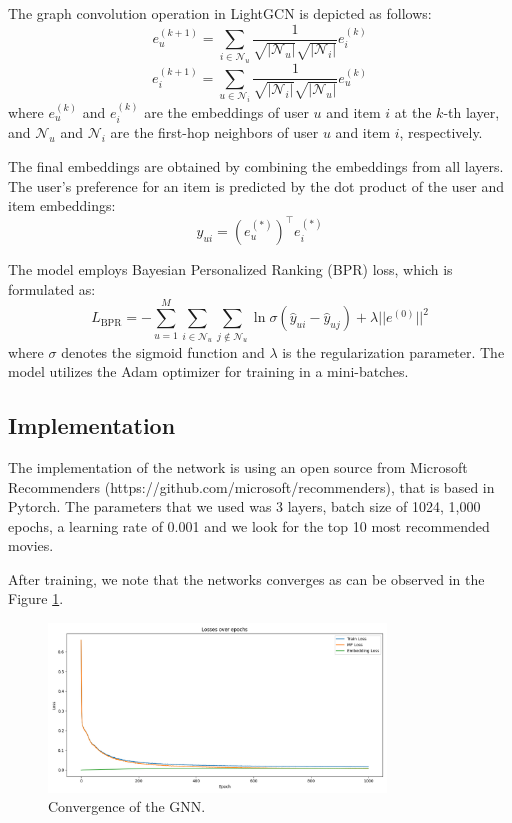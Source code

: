 \documentclass[12pt]{article}
\numberwithin{equation}{section}
\begin{document}
The graph convolution operation in LightGCN is depicted as follows:
\begin{equation}
	e_u^{(k+1)} = \sum_{i \in \mathcal{N}_u} \frac{1}{\sqrt{|\mathcal{N}_u|}\sqrt{|\mathcal{N}_i|}} e_i^{(k)}
\end{equation}
\begin{equation}
	e_i^{(k+1)} = \sum_{u \in \mathcal{N}_i} \frac{1}{\sqrt{|\mathcal{N}_i|}\sqrt{|\mathcal{N}_u|}} e_u^{(k)}
\end{equation}
where $e_u^{(k)}$ and $e_i^{(k)}$ are the embeddings of user $u$ and item $i$ at the $k$-th layer, and $\mathcal{N}_u$ and $\mathcal{N}_i$ are the first-hop neighbors of user $u$ and item $i$, respectively.


The final embeddings are obtained by combining the embeddings from all layers. The user's preference for an item is predicted by the dot product of the user and item embeddings:
\begin{equation}
	\hat{y}_{ui} = (e_u^{(*)})^\top e_i^{(*)}
\end{equation}


The model employs Bayesian Personalized Ranking (BPR) loss, which is formulated as:
\begin{equation}
	L_{\text{BPR}} = -\sum_{u=1}^{M} \sum_{i \in \mathcal{N}_u} \sum_{j \notin \mathcal{N}_u} \ln \sigma(\hat{y}_{ui} - \hat{y}_{uj}) + \lambda ||e^{(0)}||^2
\end{equation}
where $\sigma$ denotes the sigmoid function and $\lambda$ is the regularization parameter. The model utilizes the Adam optimizer for training in a mini-batches.


\subsection{Implementation}

The implementation of the network is using an open source from Microsoft Recommenders (https://github.com/microsoft/recommenders), that is based in Pytorch. The parameters that we used was 3 layers, batch size of 1024, 1,000 epochs, a learning rate of 0.001 and we look for the top 10 most recommended movies. 

After training, we note that the networks converges as can be observed in the Figure \ref{fig:losses_over_epochs}. 

\begin{figure}[h]
	\centering
	\includegraphics[width=0.8\textwidth]{losses_over_epochs.png}
	\caption{Convergence of the GNN.}
	\label{fig:losses_over_epochs}
\end{figure}
\end{document}
